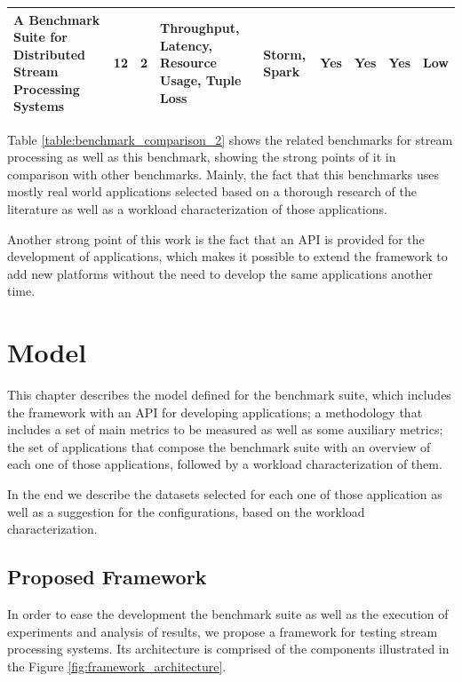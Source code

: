 \documentclass[ppgc,diss,english]{iiufrgs}
\begin{document}
\begin{table}[H]
\begin{tabular}{ p{2cm} | p{1cm} | p{1.2cm} | p{1.2cm} | p{1.5cm} | p{1.4cm} | p{1.2cm} | p{1cm} | p{0.8cm}}
\textbf{A Benchmark Suite for Distributed Stream Processing Systems} & \textbf{12} & \textbf{2} & \textbf{Throughput, Latency, Resource Usage, Tuple Loss} & \textbf{Storm, Spark} & \textbf{Yes} & \textbf{Yes} & \textbf{Yes} & \textbf{Low} \\ \hline
\end{tabular}
\end{table}

Table \ref{table:benchmark_comparison_2} shows the related benchmarks for stream processing as well as this benchmark, showing the strong points of it in comparison with other benchmarks. Mainly, the fact that this benchmarks uses mostly real world applications selected based on a thorough research of the literature as well as a workload characterization of those applications.

Another strong point of this work is the fact that an API is provided for the development of applications, which makes it possible to extend the framework to add new platforms without the need to develop the same applications another time.

\chapter{Model}
\label{chapter:model}

This chapter describes the model defined for the benchmark suite, which includes the framework with an API for developing applications; a methodology that includes a set of main metrics to be measured as well as some auxiliary metrics; the set of applications that compose the benchmark suite with an overview of each one of those applications, followed by a workload characterization of them.

In the end we describe the datasets selected for each one of those application as well as a suggestion for the configurations, based on the workload characterization.

\section{Proposed Framework}
\label{subsec:proposed-framework}

In order to ease the development the benchmark suite as well as the execution of experiments and analysis of results, we propose a framework for testing stream processing systems. Its architecture is comprised of the components illustrated in the Figure \ref{fig:framework_architecture}.
\end{document}
